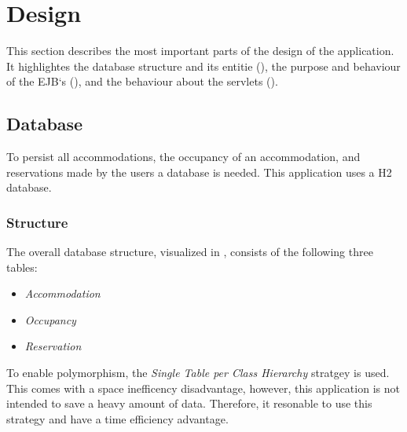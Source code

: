 \section{Design}\label{sec:02_design}
This section describes the most important parts of the design of the application. It highlightes the database structure and its entitie (), the purpose and behaviour of the EJB`s (), and the behaviour about the servlets ().


\subsection{Database}\label{sec:02_design_db}
To persist all accommodations, the occupancy of an accommodation, and reservations made by the users a database is needed. This application uses a H2 database.

\subsubsection{Structure}\label{sec:02_design_db_structure}
The overall database structure, visualized in , consists of the following three tables:
\begin{itemize}
\item \textit{Accommodation}
\item \textit{Occupancy}
\item \textit{Reservation}
\end{itemize}
To enable polymorphism, the \textit{Single Table per Class Hierarchy} stratgey is used. This comes with a space inefficency  disadvantage, however, this application is not intended to save a heavy amount of data. Therefore, it resonable to use this strategy and have a time efficiency advantage. 

